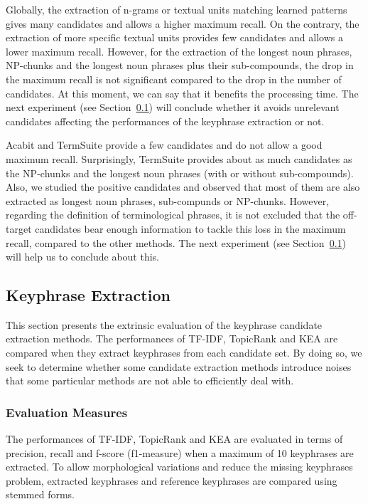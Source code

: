       Globally, the extraction of n-grams or textual units matching learned
      patterns gives many candidates and allows a higher maximum recall. On the
      contrary, the extraction of more specific textual units provides few
      candidates and allows a lower maximum recall. However, for the extraction
      of the longest noun phrases, NP-chunks and the longest noun phrases plus
      their sub-compounds, the drop in the maximum recall is not significant
      compared to the drop in the number of candidates. At this moment, we can
      say that it benefits the processing time. The next experiment
      (see Section~\ref{subsec:keyphrase_extraction}) will conclude whether it
      avoids unrelevant candidates affecting the performances of the keyphrase
      extraction or not.


      Acabit and TermSuite provide a few candidates and do not allow a good
      maximum recall. Surprisingly, TermSuite provides about as much candidates
      as the NP-chunks and the longest noun phrases (with or without
      sub-compounds). Also, we studied the positive candidates and observed that
      most of them are also extracted as longest noun phrases, sub-compunds or
      NP-chunks. However, regarding the definition of terminological phrases, it
      is not excluded that the off-target candidates bear enough information to
      tackle this loss in the maximum recall, compared to the other methods. The
      next experiment (see Section~\ref{subsec:keyphrase_extraction}) will help
      us to conclude about this.

  \subsection{Keyphrase Extraction}
  \label{subsec:keyphrase_extraction}
    This section presents the extrinsic evaluation of the keyphrase candidate
    extraction methods. The performances of TF-IDF, TopicRank and KEA are
    compared when they extract keyphrases from each candidate set. By doing so,
    we seek to determine whether some candidate extraction methods introduce
    noises that some particular methods are not able to efficiently deal with.

    \subsubsection{Evaluation Measures}
    \label{subsubsec:keyphrase_extraction_evaluation_measures}
      The performances of TF-IDF, TopicRank and KEA are evaluated in terms of
      precision, recall and f-score (f1-measure) when a maximum of 10 keyphrases
      are extracted. To allow morphological variations and reduce the missing
      keyphrases problem, extracted keyphrases and reference keyphrases are
      compared using stemmed forms.

